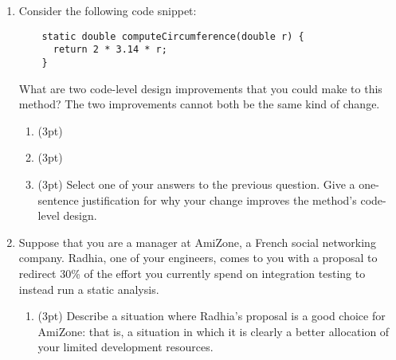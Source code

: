 \documentclass{report}
\newif\ifkey
\newcommand{\answershort}[1]{\ifkey\color{red}\underline{\textbf{#1}}\color{black}\else\underline{\hspace{3in}}\fi\xspace}
\newcommand{\answerlong}[1]{\ifkey\color{red}\textbf{#1}\color{black}\else\vspace{0.5in}\fi\xspace}
\newcommand{\shortpts}{40}
\newcommand*{\pts}[1]{\addtocounter{points}{#1}(#1pt)}
\begin{document}
\begin{spacing}{1.4}
\begin{enumerate}[leftmargin=*]
     
  \newpage

  \textbf{III. Short answer (\shortpts pts).} Answer the questions in this section in at most two sentences.

\item Consider the following code snippet: \\
  \begin{lstlisting}
    static double computeCircumference(double r) {
      return 2 * 3.14 * r;
    }
  \end{lstlisting}

  What are two code-level design improvements that you could make to this method? The two improvements cannot both be the same kind of change.
  \begin{enumerate}
  \item \pts{3} \answershort{replace 3.14 with a PI constant} 
  \item \pts{3} \answershort{rename ``r'' to ``radius'' or rename ``computeCircumference'' to ``circumference''}

  \item \pts{3} Select one of your answers to the previous question. Give a one-sentence justification for why your change
  improves the method's code-level design.

  \answerlong{For 1. above: ``avoid magic numbers'' or ``more self-documenting''. For 2. above: ``radius'' is more descriptive than ``r'', or ``compute'' is a verb, but the method returns a noun-like type.}

  \end{enumerate}

  \item Suppose that you are a manager at AmiZone, a French social networking company. Radhia, one of your engineers, comes to you
    with a proposal to redirect 30\% of the effort you currently spend on integration testing to instead run a static analysis.
\begin{enumerate}
  \item \pts{3} Describe a situation where Radhia's proposal is a good choice for AmiZone: that is, a situation in which it
    is clearly a better allocation of your limited development resources.
    \\
    \answerlong{Answers can vary. ``AmiZone is concerned about security bugs.'' is the shortest, best answer; short answers that
      identify a class of bugs that static analysis is good at will get full credit..}


\end{enumerate}
\end{enumerate}
\end{spacing}
\end{document}
